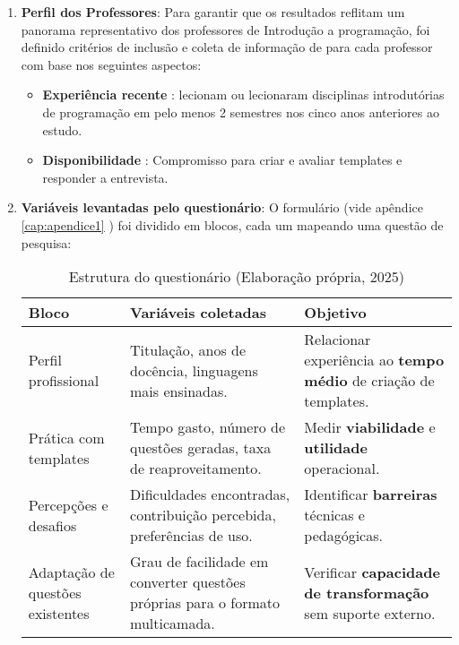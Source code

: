 \begin{enumerate}
    \item \textbf{Perfil dos Professores}:  Para garantir que os resultados reflitam um panorama representativo dos professores de Introdução a programação, foi definido critérios de inclusão e coleta de informação de para cada professor com base nos seguintes aspectos: 
    \begin{itemize}
        \item \textbf{Experiência recente} : lecionam ou lecionaram disciplinas introdutórias de programação em pelo menos 2 semestres nos cinco anos anteriores ao estudo. 
        \item \textbf{Disponibilidade} : Compromisso para criar e avaliar templates e responder a entrevista.
    \end{itemize}

    \item \textbf{Variáveis levantadas pelo questionário}:  O formulário (vide apêndice \autoref{cap:apendice1} ) foi dividido em blocos, cada um mapeando uma questão de pesquisa: 

\begin{table}[htbp]
    \centering
    \renewcommand{\arraystretch}{1.3}
    \begin{tabular}{|p{4cm}|p{5.4cm}|p{6cm}|}
        \hline
        \textbf{Bloco} & \textbf{Variáveis coletadas} & \textbf{Objetivo} \\ \hline
        Perfil profissional & Titulação, anos de docência, linguagens mais ensinadas. & Relacionar experiência ao \textbf{tempo médio} de criação de templates. \\ \hline
        Prática com templates & Tempo gasto, número de questões geradas, taxa de reaproveitamento. & Medir \textbf{viabilidade} e \textbf{utilidade} operacional. \\ \hline
        Percepções e desafios & Dificuldades encontradas, contribuição percebida, preferências de uso. & Identificar \textbf{barreiras} técnicas e pedagógicas. \\ \hline
        Adaptação de questões existentes & Grau de facilidade em converter questões próprias para o formato multicamada. & Verificar \textbf{capacidade de transformação} sem suporte externo. \\ \hline
    \end{tabular}
    \caption{Estrutura do questionário (Elaboração própria, 2025)}
    \label{tab:questionario-objetivos}
\end{table}




\end{enumerate}
